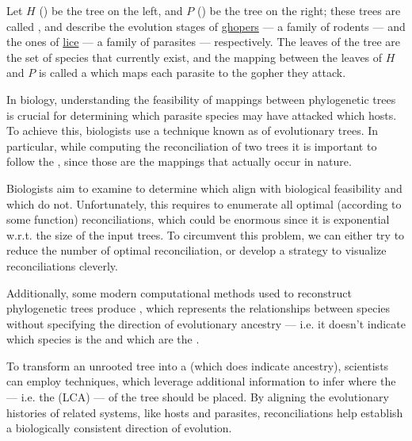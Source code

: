 \documentclass[a4paper, 12pt]{report}
\begin{document}

    Let $H$ () be the tree on the left, and $P$ () be the tree on the right; these trees are called , and describe the evolution stages of \href{https://en.wikipedia.org/wiki/Gopher}{ghopers} --- a family of rodents --- and the ones of \href{https://en.wikipedia.org/wiki/Louse}{lice} --- a family of parasites --- respectively. The leaves of the tree are the set of species that currently exist, and the mapping between the leaves of $H$ and $P$ is called a  which maps each parasite to the gopher they attack.

    In biology, understanding the feasibility of mappings between phylogenetic trees is crucial for determining which parasite species may have attacked which hosts. To achieve this, biologists use a technique known as  of evolutionary trees. In particular, while computing the reconciliation of two trees it is important to follow the , since those are the mappings that actually occur in nature.

    Biologists aim to examine  to determine which align with biological feasibility and which do not. Unfortunately, this requires to enumerate all optimal (according to some  function) reconciliations, which could be enormous since it is exponential w.r.t. the size of the input trees. To circumvent this problem, we can either try to reduce the number of optimal reconciliation, or develop a strategy to visualize reconciliations cleverly.

    Additionally, some modern computational methods used to reconstruct phylogenetic trees produce , which represents the relationships between species without specifying the direction of evolutionary ancestry --- i.e. it doesn't indicate which species is the  and which are the .

    To transform an unrooted tree into a  (which does indicate ancestry), scientists can employ  techniques, which leverage additional information to infer where the  --- i.e. the  (LCA) --- of the tree should be placed. By aligning the evolutionary histories of related systems, like hosts and parasites, reconciliations help establish a biologically consistent direction of evolution.
\end{document}

